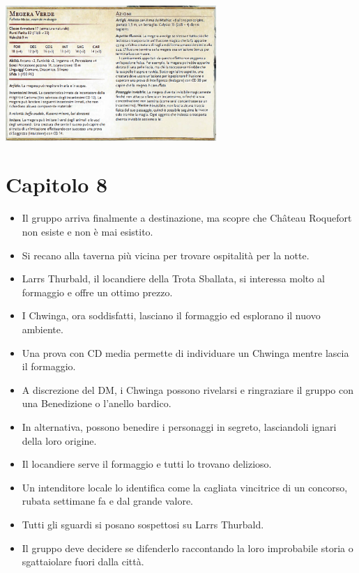 \documentclass{article}
\begin{document}
\includegraphics[width=8cm, height = 4 cm]{../Mostri/Megera_verde.png}

\section{Capitolo 8}
\begin{itemize}
    \item Il gruppo arriva finalmente a destinazione, ma scopre che Château Roquefort non esiste e non è mai esistito.
    \item Si recano alla taverna più vicina per trovare ospitalità per la notte.
    \item Larrs Thurbald, il locandiere della Trota Sballata, si interessa molto al formaggio e offre un ottimo prezzo.
    \item I Chwinga, ora soddisfatti, lasciano il formaggio ed esplorano il nuovo ambiente.
    \item Una prova con CD media permette di individuare un Chwinga mentre lascia il formaggio.
    \item A discrezione del DM, i Chwinga possono rivelarsi e ringraziare il gruppo con una Benedizione o l'anello bardico.
    \item In alternativa, possono benedire i personaggi in segreto, lasciandoli ignari della loro origine.
    \item Il locandiere serve il formaggio e tutti lo trovano delizioso.
    \item Un intenditore locale lo identifica come la cagliata vincitrice di un concorso, rubata settimane fa e dal grande valore.
    \item Tutti gli sguardi si posano sospettosi su Larrs Thurbald.
    \item Il gruppo deve decidere se difenderlo raccontando la loro improbabile storia o sgattaiolare fuori dalla città.
\end{itemize}
\end{document}
